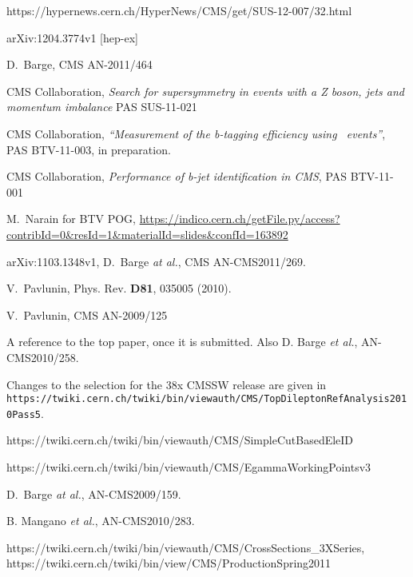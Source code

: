 \begin{thebibliography}{10}

 https://hypernews.cern.ch/HyperNews/CMS/get/SUS-12-007/32.html

 	arXiv:1204.3774v1 [hep-ex]

 D.~Barge, CMS AN-2011/464

 CMS Collaboration, {{\it Search for supersymmetry in events with a Z boson, jets and momentum imbalance}} PAS SUS-11-021

 CMS Collaboration, {{\it ``Measurement of the b-tagging efficiency using \ttbar\ events''}}, 
	PAS BTV-11-003, in preparation.

 CMS Collaboration, {{\it Performance of b-jet identification in CMS}}, PAS BTV-11-001

 M.~Narain for BTV POG, \url{https://indico.cern.ch/getFile.py/access?contribId=0&resId=1&materialId=slides&confId=163892}

 arXiv:1103.1348v1, D.~Barge {\em at al.}, CMS AN-CMS2011/269.

 V.~Pavlunin, Phys. Rev. {\bf D81}, 035005 (2010).
    
 V.~Pavlunin, CMS AN-2009/125

 A reference to the top paper, once it is submitted.  Also
D. Barge {\em et al.}, AN-CMS2010/258.  

 Changes to the selection for the 38x CMSSW release are given in 
{\tt https://twiki.cern.ch/twiki/bin/viewauth/CMS/TopDileptonRefAnalysis2010Pass5}.

 https://twiki.cern.ch/twiki/bin/viewauth/CMS/SimpleCutBasedEleID

 https://twiki.cern.ch/twiki/bin/viewauth/CMS/EgammaWorkingPointsv3

 D.~Barge {\em at al.}, AN-CMS2009/159.

 B. Mangano {\em et al.}, %
AN-CMS2010/283.

 https://twiki.cern.ch/twiki/bin/viewauth/CMS/CrossSections\_3XSeries, 
https://twiki.cern.ch/twiki/bin/view/CMS/ProductionSpring2011


\end{thebibliography}
